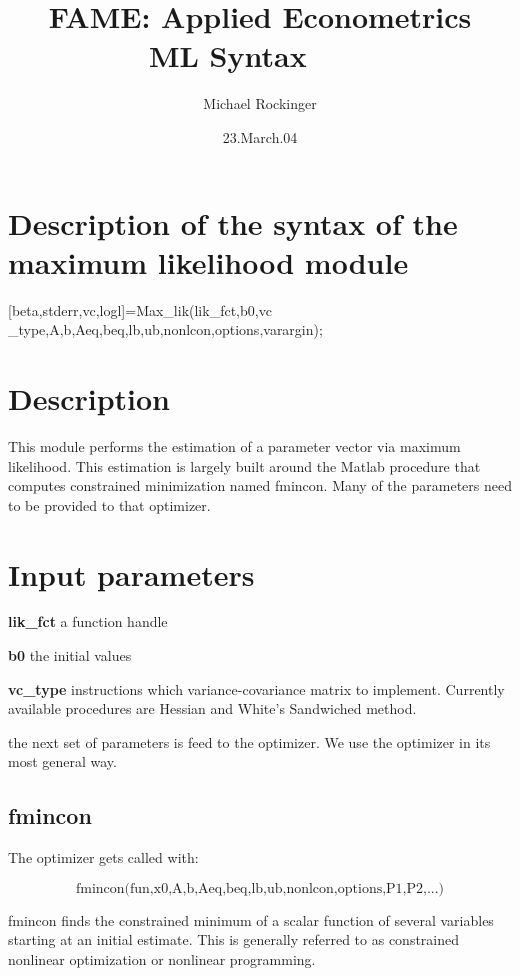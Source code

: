 \documentclass[12pt,a4paper]{article}
\begin{document}
\title{FAME: Applied Econometrics\\
ML Syntax\ \ \ \ }
\author{Michael Rockinger}
\date{23.March.04}
\maketitle

\section{Description of the syntax of the maximum likelihood module}

[beta,stderr,vc,logl]=Max\_lik(lik\_fct,b0,vc%
\_type,A,b,Aeq,beq,lb,ub,nonlcon,options,varargin);

\section{Description}

This module performs the estimation of a parameter vector via maximum
likelihood. This estimation is largely built around the Matlab procedure
that computes constrained minimization named fmincon. Many of the parameters
need to be provided to that optimizer.

\section{Input parameters}

\textbf{lik\_fct} a function handle

\textbf{b0} the initial values

\textbf{vc\_type} instructions which variance-covariance matrix to
implement. Currently available procedures are Hessian and White's Sandwiched
method.

the next set of parameters is feed to the optimizer. We use the optimizer in
its most general way.

\subsection{fmincon}

The optimizer gets called with:

\begin{equation*}
\text{fmincon(fun,x0,A,b,Aeq,beq,lb,ub,nonlcon,options,P1,P2,...)}
\end{equation*}

fmincon finds the constrained minimum of a scalar function of several
variables starting at an initial estimate. This is generally referred to as
constrained nonlinear optimization or nonlinear programming.
\end{document}

